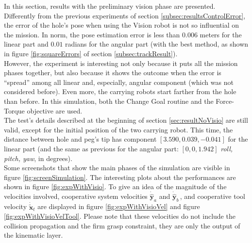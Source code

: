 In this section, results with the preliminary vision phase are presented.\\
Differently from the previous experiments of section \ref{subsec:resultsControlError}, the error of the hole's pose when using the Vision robot is not so influential on the mission. In norm, the pose estimation error is less than $0.006$ meters for the linear part and $0.01$ radians for the angular part (with the best method, as shown in figure \ref{fig:squareErrors} of section \ref{subsec:trackResult}).\\ 
However, the experiment is interesting not only because it puts all the mission phases together, but also because it shows the outcome when the error is \enquote{spread} among all linear and, especially, angular component (which was not considered before). Even more, the carrying robots start farther from the hole than before. In this simulation, both the Change Goal routine and the Force-Torque objective are used.\\
The test's details described at the beginning of section \ref{sec:resultNoVisio} are still valid, except for the initial position of the two carrying robot. This time, the distance between hole and peg's tip has component $[3.590, 0.039, -0.041]$ for the linear part (and the same as previous for the angular part: $[0, 0, 1.942]$ \textit{roll, pitch, yaw}, in degrees).\\
Some screenshots that show the main phases of the simulation are visible in figure \ref{fig:screenSimulation}. The interesting plots about the performances are shown in figure \ref{fig:expWithVisio}. To give an idea of the magnitude of the velocities involved, cooperative system velocities $\dot{\hat{\boldsymbol{y}}}_a$ and $\dot{\hat{\boldsymbol{y}}}_b\,$, and cooperative tool velocity $\dot{\tilde{\boldsymbol{x}}}_t$ are displayed in figure \ref{fig:expWithVisioVel} and figure \ref{fig:expWithVisioVelTool}. Please note that these velocities do not include the collision propagation and the firm grasp constraint, they are only the output of the kinematic layer.



